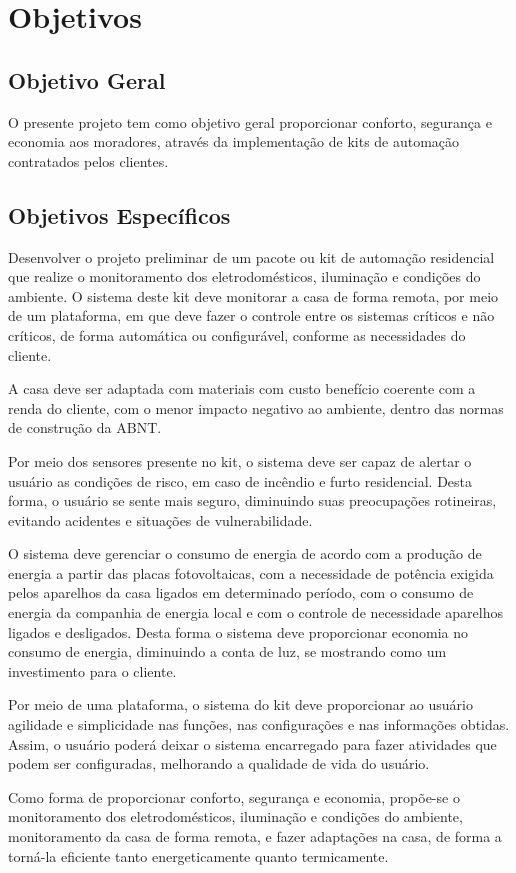 \chapter[Objetivos]{Objetivos}
\section{Objetivo Geral}
\par O presente projeto tem como objetivo geral proporcionar conforto, segurança e economia aos moradores, através da implementação de kits de automação contratados pelos clientes.
\section{Objetivos Específicos}
\par Desenvolver o projeto preliminar de um pacote ou kit de automação residencial que realize o monitoramento dos eletrodomésticos, iluminação e condições do ambiente. O sistema deste kit deve monitorar a casa de forma remota, por meio de um plataforma, em que deve fazer o controle entre os sistemas críticos e não críticos, de forma automática ou configurável, conforme as necessidades do cliente.
\par A casa deve ser adaptada com materiais com custo benefício coerente com a renda do cliente, com o menor impacto negativo ao ambiente, dentro das normas de construção da ABNT.
\par Por meio dos sensores presente no kit, o sistema deve ser capaz de alertar o usuário as condições de risco, em caso de incêndio e furto residencial. Desta forma, o usuário se sente mais seguro, diminuindo suas preocupações rotineiras, evitando acidentes e situações de vulnerabilidade.
\par O sistema deve gerenciar o consumo de energia de acordo com a produção de energia a partir das placas fotovoltaicas, com a necessidade de potência exigida pelos aparelhos da casa ligados em determinado período, com o  consumo de energia da companhia de energia local e com o controle de necessidade aparelhos ligados e desligados. Desta forma o sistema deve proporcionar economia no consumo de energia, diminuindo a conta de luz, se mostrando como um investimento para o cliente.
\par Por meio de uma plataforma, o sistema do kit deve proporcionar ao usuário agilidade e simplicidade nas funções, nas configurações e nas informações obtidas. Assim, o usuário poderá deixar o sistema encarregado para fazer atividades que podem ser configuradas, melhorando a qualidade de vida do usuário.
\par Como forma de proporcionar conforto, segurança e economia, propõe-se o  monitoramento dos eletrodomésticos, iluminação e condições do ambiente, monitoramento  da casa de forma remota,  e fazer adaptações na casa, de forma a torná-la eficiente tanto energeticamente quanto termicamente.
